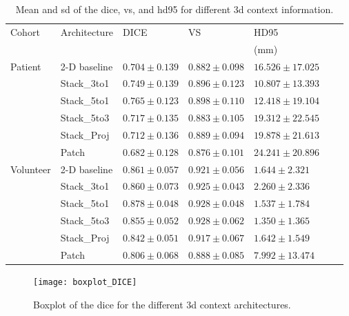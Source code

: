 \begin{table}[htbp]
   \centering
   \caption[Results for 3-D Context]{Mean and \gls{sd} of the \acrlong{dice}, \acrlong{vs}, and \acrlong{hd95} for different \gls{3d} context information.}
   \begin{tabular}{l*{6}{l}}
      \toprule
      Cohort	& Architecture	& DICE				& VS				& HD95\\
      			&					&					&					& (mm)\\
      \midrule
      Patient   & 2-D baseline & $0.704 \pm 0.139$ & $0.882 \pm 0.098$ & $16.526 \pm 17.025$ \\
                & Stack\_3to1  & $0.749 \pm 0.139$ & $0.896 \pm 0.123$ & $\mathbf{10.807 \pm 13.393}$ \\
                & Stack\_5to1  & $\mathbf{0.765 \pm 0.123}$ & $\mathbf{0.898 \pm 0.110}$ & $12.418 \pm 19.104$ \\
                & Stack\_5to3  & $0.717 \pm 0.135$ & $0.883 \pm 0.105$ & $19.312 \pm 22.545$ \\
                & Stack\_Proj  & $0.712 \pm 0.136$ & $0.889 \pm 0.094$ & $19.878 \pm 21.613$ \\
                & Patch & $0.682 \pm 0.128$ & $0.876 \pm 0.101$ & $24.241 \pm 20.896$ \\                
      \midrule
      Volunteer & 2-D baseline & $0.861 \pm 0.057$ & $0.921 \pm 0.056$ & $1.644  \pm 2.321 $ \\
                & Stack\_3to1  & $0.860 \pm 0.073$ & $0.925 \pm 0.043$ & $2.260  \pm 2.336 $ \\
                & Stack\_5to1  & $\mathbf{0.878 \pm 0.048}$ & $\mathbf{0.928 \pm 0.048}$ & $1.537  \pm 1.784 $ \\
                & Stack\_5to3  & $0.855 \pm 0.052$ & $0.928 \pm 0.062$ & $\mathbf{1.350  \pm 1.365} $ \\                
                & Stack\_Proj  & $0.842 \pm 0.051$ & $0.917 \pm 0.067$ & $1.642  \pm 1.549 $ \\
                & Patch & $0.806 \pm 0.068$ & $0.888 \pm 0.085$ & $7.992  \pm 13.474$ \\
      \bottomrule
   \end{tabular}
   \label{tab:results_3d_context_small}
\end{table}

\begin{figure}[htbp]
	\centering
	\texttt{[image: boxplot\_DICE]}
    \caption[Boxplot of the \glsdesc{dice} for 3-D Context]{Boxplot of the \acrlong{dice} for the different \gls{3d} context architectures.}
    \label{fig:results_boxplot_dice}
\end{figure}

